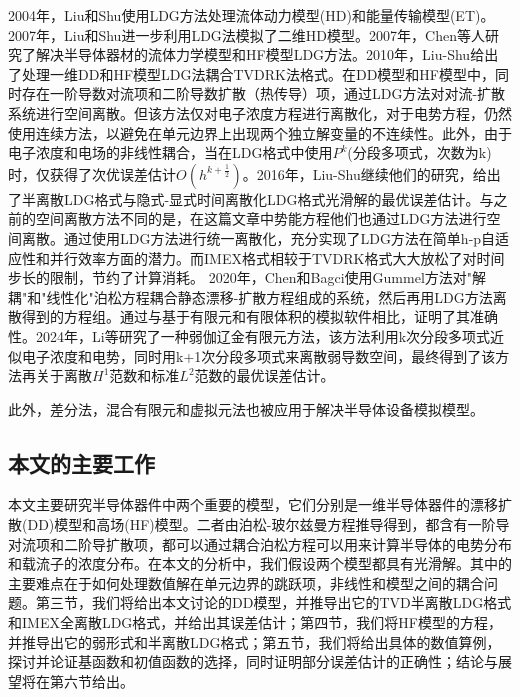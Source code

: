 2004年，Liu和Shu使用LDG方法处理流体动力模型(HD)和能量传输模型(ET)\cite{liu2004locala}。2007年，Liu和Shu进一步利用LDG法模拟了二维HD模型\cite{liu2007localb}。2007年，Chen等人研究了解决半导体器材的流体力学模型和HF模型LDG方法\cite{chen2007discontinuous}。2010年，Liu-Shu给出了处理一维DD和HF模型LDG法耦合TVDRK法格式\cite{liu2010error}。在DD模型和HF模型中，同时存在一阶导数对流项和二阶导数扩散（热传导）项，通过LDG方法对对流-扩散系统进行空间离散。但该方法仅对电子浓度方程进行离散化，对于电势方程，仍然使用连续方法，以避免在单元边界上出现两个独立解变量的不连续性。此外，由于电子浓度和电场的非线性耦合，当在LDG格式中使用$P^k$(分段多项式，次数为k)时，仅获得了次优误差估计$O(h^{k+\frac{1}{2}})$。2016年，Liu-Shu继续他们的研究，给出了半离散LDG格式与隐式-显式时间离散化LDG格式光滑解的最优误差估计\cite{liu2016analysis}。与之前的空间离散方法不同的是，在这篇文章中势能方程他们也通过LDG方法进行空间离散。通过使用LDG方法进行统一离散化，充分实现了LDG方法在简单h-p自适应性和并行效率方面的潜力。而IMEX格式相较于TVDRK格式大大放松了对时间步长的限制，节约了计算消耗。
2020年，Chen和Bagci使用Gummel方法对"解耦"和"线性化"泊松方程耦合静态漂移-扩散方程组成的系统，然后再用LDG方法离散得到的方程组\cite{chen2020steady}。通过与基于有限元和有限体积的模拟软件相比，证明了其准确性。2024年，Li等研究了一种弱伽辽金有限元方法，该方法利用k次分段多项式近似电子浓度和电势，同时用k+1次分段多项式来离散弱导数空间，最终得到了该方法再关于离散$H^1$范数和标准$L^2$范数的最优误差估计。

此外，差分法\cite{ding2019optimal}，混合有限元\cite{gao2018linearized}和虚拟元法\cite{liu2021virtual}也被应用于解决半导体设备模拟模型。
\subsection{本文的主要工作}
本文主要研究半导体器件中两个重要的模型，它们分别是一维半导体器件的漂移扩散(DD)模型和高场(HF)模型。二者由泊松-玻尔兹曼方程推导得到，都含有一阶导对流项和二阶导扩散项，都可以通过耦合泊松方程可以用来计算半导体的电势分布和载流子的浓度分布。在本文的分析中，我们假设两个模型都具有光滑解。其中的主要难点在于如何处理数值解在单元边界的跳跃项，非线性和模型之间的耦合问题。第三节，我们将给出本文讨论的DD模型，并推导出它的TVD半离散LDG格式和IMEX全离散LDG格式，并给出其误差估计；第四节，我们将HF模型的方程，并推导出它的弱形式和半离散LDG格式；第五节，我们将给出具体的数值算例，探讨并论证基函数和初值函数的选择，同时证明部分误差估计的正确性；结论与展望将在第六节给出。
